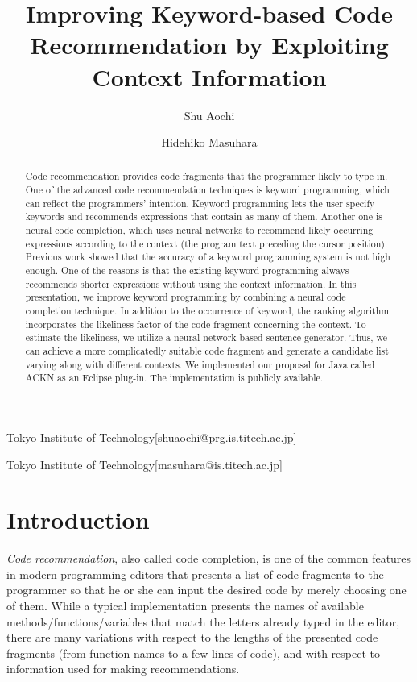 \documentclass[PRO,english]{ipsj}
\begin{document}
\title{Improving Keyword-based Code Recommendation by Exploiting Context Information}
\author{Shu Aochi}{Tokyo Institute of Technology}[shuaochi@prg.is.titech.ac.jp]
\author{Hidehiko Masuhara}{Tokyo Institute of Technology}[masuhara@is.titech.ac.jp]

\begin{abstract}
Code recommendation provides code fragments that the programmer likely to type in. One of the advanced code recommendation techniques is keyword programming, which can reflect the programmers' intention. Keyword programming lets the user specify keywords and recommends expressions that contain as many of them. Another one is neural code completion, which uses neural networks to recommend likely occurring expressions according to the context (the program text preceding the cursor position). Previous work showed that the accuracy of a keyword programming system is not high enough. One of the reasons is that the existing keyword programming always recommends shorter expressions without using the context information. In this presentation, we improve keyword programming by combining a neural code completion technique. In addition to the occurrence of keyword, the ranking algorithm incorporates the likeliness factor of the code fragment concerning the context. To estimate the likeliness, we utilize a neural network-based sentence generator. Thus, we can achieve a more complicatedly suitable code fragment and generate a candidate list varying along with different contexts. We implemented our proposal for Java called ACKN as an Eclipse plug-in. The implementation is publicly available.
\end{abstract}

\maketitle

\section{Introduction}

\emph{Code recommendation}, also called code completion, is one of the common features in modern programming editors that presents a list of code fragments to the programmer so that he or she can input the desired code by merely choosing one of them.
While a typical implementation presents the names of available methods/functions/variables that match the letters already typed in the editor, 
there are many variations with respect to the lengths of the presented code fragments (from function names to a few lines of code), and with respect to information used for making recommendations.
\end{document}
